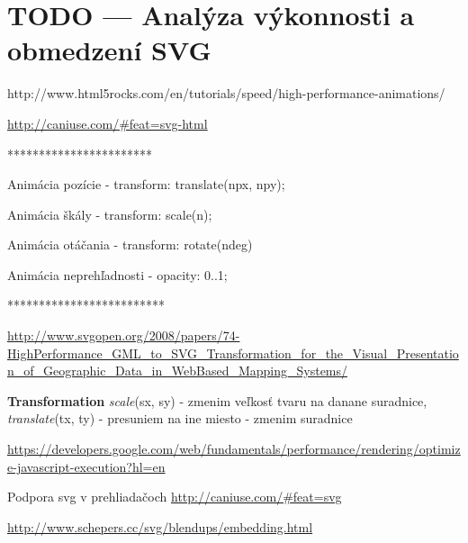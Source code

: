\chapter{TODO --- Analýza výkonnosti a obmedzení SVG}


http://www.html5rocks.com/en/tutorials/speed/high-performance-animations/

\url{http://caniuse.com/#feat=svg-html}


***********************

Animácia pozície 
- transform: translate(npx, npy);

Animácia škály 
- transform: scale(n);

Animácia otáčania
- transform: rotate(ndeg)

Animácia neprehľadnosti 
- opacity: 0..1;

*************************

\url{http://www.svgopen.org/2008/papers/74-HighPerformance_GML_to_SVG_Transformation_for_the_Visual_Presentation_of_Geographic_Data_in_WebBased_Mapping_Systems/}


\textbf{Transformation}
\textit{scale}(sx, sy) - zmenim veľkosť tvaru na danane suradnice, 
\textit{translate}(tx, ty) - presuniem na ine miesto - zmenim suradnice 

\url{https://developers.google.com/web/fundamentals/performance/rendering/optimize-javascript-execution?hl=en}

Podpora svg v prehliadačoch
\url{http://caniuse.com/#feat=svg}

\url{http://www.schepers.cc/svg/blendups/embedding.html}